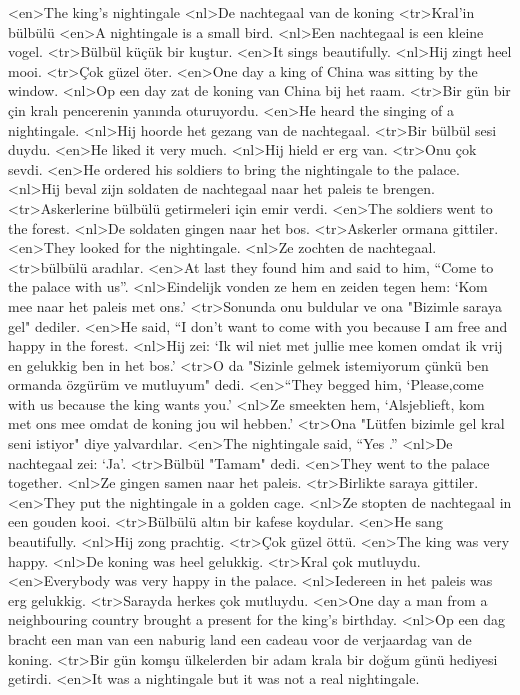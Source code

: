 <en>The king’s nightingale
<nl>De nachtegaal van de koning
<tr>Kral'in bülbülü
<en>A nightingale is a small bird.
<nl>Een nachtegaal is een kleine vogel.
<tr>Bülbül küçük bir kuştur.
<en>It sings beautifully.
<nl>Hij zingt heel mooi.
<tr>Çok güzel öter.
<en>One day a king of China was sitting by the window.
<nl>Op een day zat de koning van China bij het raam.
<tr>Bir gün bir çin kralı pencerenin yanında oturuyordu.
<en>He heard the singing of a nightingale.
<nl>Hij hoorde het gezang van de nachtegaal.
<tr>Bir bülbül sesi duydu.
<en>He liked it very much.
<nl>Hij hield er erg van.
<tr>Onu çok sevdi.
<en>He ordered his soldiers to bring the nightingale to the palace.
<nl>Hij beval zijn soldaten de nachtegaal naar het paleis te brengen.
<tr>Askerlerine bülbülü getirmeleri için emir verdi.
<en>The soldiers went to the forest.
<nl>De soldaten gingen naar het bos.
<tr>Askerler ormana gittiler.
<en>They looked for the nightingale.
<nl>Ze zochten de nachtegaal.
<tr>bülbülü aradılar.
<en>At last they found him and said to him, “Come to the palace with us”.
<nl>Eindelijk vonden ze hem en zeiden tegen hem: `Kom mee naar het paleis met ons.'
<tr>Sonunda onu buldular ve ona "Bizimle saraya gel" dediler.
<en>He said, “I don’t want to come with you  because  I am free and happy in the forest.
<nl>Hij zei: `Ik wil niet met jullie mee komen omdat ik vrij en gelukkig ben in het bos.'
<tr>O da "Sizinle gelmek istemiyorum çünkü ben ormanda özgürüm ve mutluyum" dedi.
<en>“They begged him, `Please,come with us because the king wants you.'
<nl>Ze smeekten hem, `Alsjeblieft, kom met ons mee omdat de koning jou wil hebben.'
<tr>Ona "Lütfen bizimle gel kral seni istiyor" diye yalvardılar.
<en>The nightingale said, “Yes .”
<nl>De nachtegaal zei: `Ja'.
<tr>Bülbül "Tamam" dedi.
<en>They went to the palace together.
<nl>Ze gingen samen naar het paleis.
<tr>Birlikte saraya gittiler.
<en>They put the nightingale in a golden cage.
<nl>Ze stopten de nachtegaal in een gouden kooi.
<tr>Bülbülü altın bir kafese koydular.
<en>He sang beautifully.
<nl>Hij zong prachtig.
<tr>Çok güzel öttü.
<en>The king was very happy.
<nl>De koning was heel gelukkig.
<tr>Kral çok mutluydu.
<en>Everybody was very happy in the palace.
<nl>Iedereen in het paleis was erg gelukkig.
<tr>Sarayda herkes çok mutluydu.
<en>One day a man from a neighbouring country brought a present for the king’s birthday.
<nl>Op een dag bracht een man van een naburig land een cadeau voor de verjaardag van de koning.
<tr>Bir gün komşu ülkelerden bir adam krala bir doğum günü hediyesi getirdi.
<en>It was a nightingale but it was not a real nightingale.
